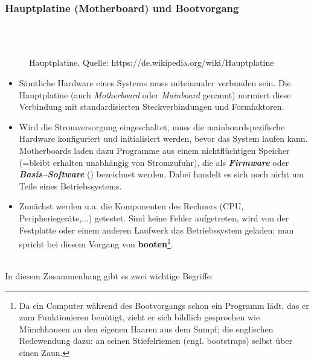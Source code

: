 \subsubsection{Hauptplatine (Motherboard) und Bootvorgang}
	\begin{figure}[h!]
		\centering
		~\\~\\
		\caption[Hauptplatine]{Hauptplatine. Quelle: https://de.wikipedia.org/wiki/Hauptplatine}
	\end{figure}
	\begin{itemize}
		\item Sämtliche Hardware eines Systems muss miteinander verbunden sein. Die Hauptplatine (auch \textit{Motherboard} oder \textit{Mainboard} genannt) normiert diese Verbindung mit standardisierten Steckverbindungen und Formfaktoren.
		\item Wird die Stromversorgung eingeschaltet, muss die mainboardspezifische Hardware konfiguriert und initialisiert werden, bevor das System laufen kann. Motherboards laden dazu Programme aus einem nichtflüchtigen Speicher (=bleibt erhalten unabhängig von Stromzufuhr), die als \textbf{\textit{Firmware}} oder \textbf{\textit{Basis--Software}} (\cite[2.1]{gumm2}) bezeichnet werden. Dabei handelt es sich noch nicht um Teile eines Betriebssystems.
		\item Zunächst werden u.a. die Komponenten des Rechners (CPU, Peripheriegeräte,...) getestet. Sind keine Fehler aufgetreten, wird von der Festplatte oder einem anderen Laufwerk das Betriebssystem geladen; man spricht bei diesem Vorgang von \textbf{booten}\footnote{Da ein Computer während des Bootvorgangs schon ein Programm lädt, das er zum Funktionieren benötigt, zieht er sich bildlich gesprochen wie Münchhausen an den eigenen Haaren aus dem Sumpf; die englischen Redewendung dazu: an seinen Stiefelriemen (engl. bootstraps) selbst über einen Zaun.}.
	\end{itemize}
%
~\\
In diesem Zusammenhang gibt es zwei wichtige Begriffe:

